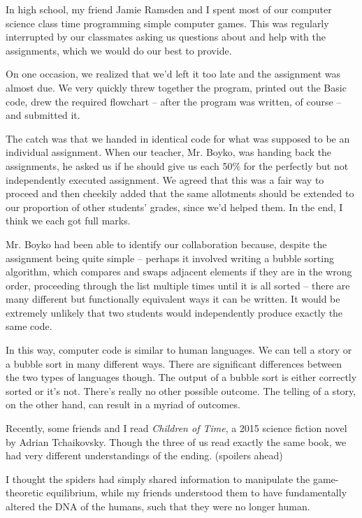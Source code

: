 In high school, my friend Jamie Ramsden and I spent most of our computer science class time programming simple computer games. This was regularly interrupted by our classmates asking us questions about and help with the assignments, which we would do our best to provide.

On one occasion, we realized that we'd left it too late and the assignment was almost due. We very quickly threw together the program, printed out the Basic code, drew the required flowchart -- after the program was written, of course -- and submitted it.

The catch was that we handed in identical code for what was supposed to be an individual assignment. When our teacher, Mr. Boyko, %
was handing back the assignments, he asked us if he should give us each 50\% for the perfectly but not independently executed assignment. We agreed that this was a fair way to proceed and then cheekily added that the same allotments should be extended to our proportion of other students' grades, since we'd helped them. In the end, I think we each got full marks.

Mr. Boyko had been able to identify our collaboration because, despite the assignment being quite simple -- perhaps it involved writing a bubble sorting algorithm, which compares and swaps adjacent elements if they are in the wrong order, proceeding through the list multiple times until it is all sorted -- there are many different but functionally equivalent ways it can be written. It would be extremely unlikely that two students would independently produce exactly the same code.

In this way, computer code is similar to human languages. We can tell a story or a bubble sort in many different ways. There are significant differences between the two types of languages though. The output of a bubble sort is either correctly sorted or it's not. There's really no other possible outcome. The telling of a story, on the other hand, can result in a myriad of outcomes.

Recently, some friends and I read \textit{Children of Time}, a 2015 science fiction novel by Adrian Tchaikovsky. Though the three of us read exactly the same book, we had very different understandings of the ending. (spoilers ahead) 

I thought the spiders had simply shared information to manipulate the game-theoretic equilibrium, while my friends understood them to have fundamentally altered the DNA of the humans, such that they were no longer human.

